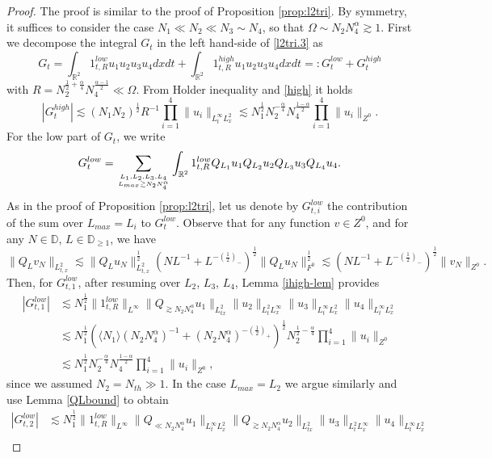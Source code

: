 \documentclass{amsart}
\theoremstyle{definition}
\theoremstyle{remark}
\def\R{{\mathbb R}}
\def\D{{\mathbb D}}
\numberwithin{equation}{section}
\newcommand\cro[1]{\langle #1 \rangle}
\begin{document}
\begin{proof}
  The proof is similar to the proof of Proposition \ref{prop:l2tri}. By symmetry, it suffices to consider the case $N_1\ll N_2\ll N_3\sim N_4$, so that $\Omega\sim N_2N_4^\alpha\gtrsim 1$. First we decompose the integral $G_t$ in the left hand-side of \eqref{l2tri.3} as
  $$
  G_t = \int_{\R^2}1_{t,R}^{low}u_1u_2u_3u_4dxdt + \int_{\R^2}1_{t,R}^{high}u_1u_2u_3u_4dxdt =: G_t^{low} + G_t^{high}
  $$
  with $R=N_2^{\frac12+\frac{\alpha}4}N_4^{\frac{\alpha-1}2}\ll \Omega$. From Holder inequality and \eqref{high} it holds
  $$
  |G_t^{high}|\lesssim (N_1N_2)^{\frac 12} R^{-1} \prod_{i=1}^4\|u_i\|_{L^\infty_tL^2_x} \lesssim N_1^{\frac 12}N_2^{-\frac \alpha 4} N_4^{\frac{1-\alpha}2} \prod_{i=1}^4 \|u_i\|_{Z^0}.
  $$
  For the low part of $G_t$, we write
  $$
  G_t^{low} = \sum_{L_1,L_2,L_3,L_4  \atop L_{max}\gtrsim N_2N_4^\alpha} \int_{\R^2} 1_{t,R}^{low} Q_{L_1}u_1 Q_{L_2}u_2 Q_{L_3}u_3 Q_{L_4}u_4. 
  $$
  As in the proof of Proposition \ref{prop:l2tri}, let us denote by $G_{t,i}^{low}$ the contribution of the sum over $L_{max}=L_i$ to $G_t^{low}$. Observe that for any function $v \in Z^0$, and for any $N \in \D$, $L \in \D_{\ge 1}$, we have
    \[ \|Q_Lv_N\|_{L^2_{t,x}} \lesssim \|Q_Lu_N\|_{L^2_{t,x}}^{\frac12}(NL^{-1}+L^{-(\frac12)_-})^{\frac12}\|Q_Lu_N\|_{F^0}^{\frac12} \lesssim (NL^{-1}+L^{-(\frac12)_-})^{\frac12} \|v_N\|_{Z^0} . \]
  Then, for $G_{t,1}^{low}$, after resuming over $L_2$, $L_3$, $L_4$, Lemma \ref{ihigh-lem} provides
  \begin{align*}
    |G_{t,1}^{low}| &\lesssim N_1^{\frac 12} \|1_{t,R}^{low}\|_{L^\infty} \|Q_{\gtrsim N_2N_4^\alpha}u_1\|_{L^2_{tx}} \|u_2\|_{L^2_tL^\infty_x} \|u_3\|_{L^\infty_tL^2_x} \|u_4\|_{L^\infty_tL^2_x}\\
    &\lesssim N_1^{\frac 12} (\cro{N_1}(N_2N_4^\alpha)^{-1} + (N_2N_4^\alpha)^{-(\frac 12)_+})^{\frac 12} N_2^{\frac 12-\frac \alpha 4}\prod_{i=1}^4 \|u_i\|_{Z^0}\\
    & \lesssim N_1^{\frac 12}N_2^{-\frac \alpha 4} N_4^{\frac{1-\alpha}2} \prod_{i=1}^4 \|u_i\|_{Z^0},
  \end{align*}
  since we assumed $ N_2=N_{th}\gg 1$.
  In the case $L_{max}=L_2$ we argue similarly and use Lemma \ref{QLbound} to obtain
  \begin{align*}
    |G_{t,2}^{low}| &\lesssim N_1^{\frac 12} \|1_{t,R}^{low}\|_{L^\infty} \|Q_{\ll N_2N_4^\alpha}u_1\|_{L^\infty_tL^2_x} \|Q_{\gtrsim N_2N_4^\alpha}u_2\|_{L^2_{tx}} \|u_3\|_{L^2_tL^\infty_x} \|u_4\|_{L^\infty_tL^2_x}\\

\end{align*}
\end{proof}
\end{document}
